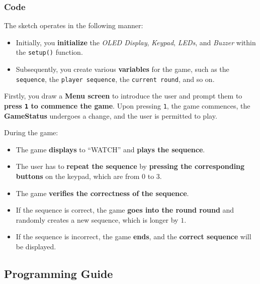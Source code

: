\documentclass[10pt, oneside]{article}
\theoremstyle{remark}
\begin{document}
\subsubsection{Code}
The sketch operates in the following manner:

\begin{itemize}
  \item Initially, you \textbf{initialize} the \textit{OLED Display}, \textit{Keypad}, \textit{LEDs}, and \textit{Buzzer} within the \texttt{setup()} function. 
  \item Subsequently, you create various \textbf{variables} for the game, such as the \texttt{sequence}, the \texttt{player sequence}, the \texttt{current round}, and so on.
\end{itemize}

\noindent Firstly, you draw a \textbf{Menu screen} to introduce the user and prompt them to \textbf{press \texttt{1} to commence the game}. Upon pressing \texttt{1}, the game commences, the \textbf{GameStatus} undergoes a change, and the user is permitted to play.

\noindent During the game:
\begin{itemize}
  \item The game \textbf{displays} to \enquote{WATCH} and \textbf{plays the sequence}.
  \item The user has to \textbf{repeat the sequence} by \textbf{pressing the corresponding buttons} on the keypad, which are from $0$ to $3$.
  \item The game \textbf{verifies the correctness of the sequence}.
  \item If the sequence is correct, the game \textbf{goes into the round round} and randomly creates a new sequence, which is longer by $1$.
  \item If the sequence is incorrect, the game \textbf{ends}, and the \textbf{correct sequence} will be displayed.
\end{itemize}

\subsection{Programming Guide}
\end{document}
